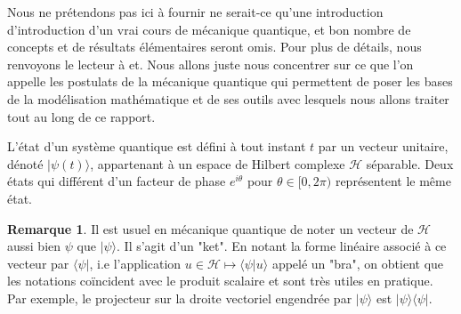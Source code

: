 \documentclass[12pt,openany,a4paper, titlepage]{article}
\newcommand{\HH}{\mathcal{H}}
\theoremstyle{definition}
\theoremstyle{definition}
\theoremstyle{definition}
\theoremstyle{definition}
\theoremstyle{definition}
\newtheorem{rem}{Remarque}
\theoremstyle{definition}
\begin{document}
Nous ne prétendons pas ici à fournir ne serait-ce qu'une introduction d'introduction d'un vrai cours de mécanique quantique, et bon nombre de concepts et de résultats élémentaires seront omis. Pour plus de détails, nous renvoyons le lecteur à \cite{Quantum} et\cite{Levitt}. Nous allons juste nous concentrer sur ce que l'on appelle les postulats de la mécanique quantique qui permettent de poser les bases de la modélisation mathématique et de ses outils avec lesquels nous allons traiter tout au long de ce rapport.

\vspace{3mm}
\begin{tcolorbox}[colback=gray!5!white,
                  colframe=gray!80!white,
                  title= Postulat 1 : Principe de superposition ]
L'état d'un système quantique est défini à tout instant $t$ par un vecteur unitaire, dénoté $|\psi(t)\rangle$, appartenant à un espace de Hilbert complexe $\HH$ séparable. Deux états qui différent d'un facteur de phase $e^{i\theta}$ pour $\theta\in[0,2\pi)$ représentent le même état.
\end{tcolorbox}
\vspace{3mm}

\begin{rem}
    Il est usuel en mécanique quantique de noter un vecteur 
    de $\HH$ aussi bien $\psi$ que $|\psi\rangle$. Il s'agit d'un "ket". En notant la forme linéaire associé à ce vecteur par $\langle\psi |$, i.e l'application $u\in\HH \mapsto \langle \psi | u\rangle$ appelé un "bra", on obtient que les notations coïncident avec le produit scalaire et sont très utiles en pratique. Par exemple, le projecteur sur la droite vectoriel engendrée par $|\psi\rangle$ est $|\psi\rangle\langle\psi |$.
\end{rem}
\end{document}
